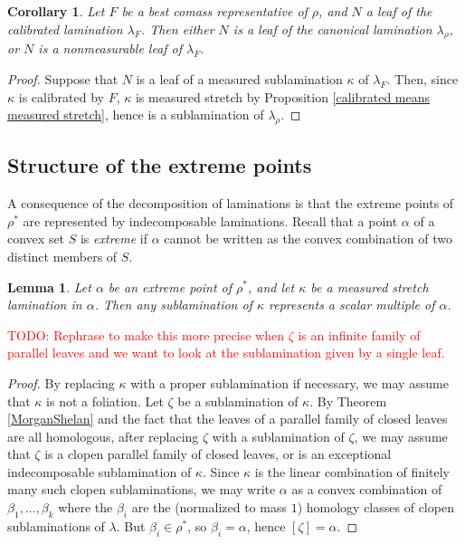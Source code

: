 \documentclass[reqno,11pt]{amsart}
\newcommand{\dfn}[1]{\emph{#1}\index{#1}}
\newtheorem{lemma}[theorem]{Lemma}
\newtheorem{corollary}[theorem]{Corollary}
\theoremstyle{definition}
\numberwithin{equation}{section}
\newcommand\todo[1]{\textcolor{red}{TODO: #1}}
\begin{document}
\begin{corollary}
Let $F$ be a best comass representative of $\rho$, and $N$ a leaf of the calibrated lamination $\lambda_F$.
Then either $N$ is a leaf of the canonical lamination $\lambda_\rho$, or $N$ is a nonmeasurable leaf of $\lambda_F$.
\end{corollary}
\begin{proof}
Suppose that $N$ is a leaf of a measured sublamination $\kappa$ of $\lambda_F$.
Then, since $\kappa$ is calibrated by $F$, $\kappa$ is measured stretch by Proposition \ref{calibrated means measured stretch}, hence is a sublamination of $\lambda_\rho$.
\end{proof}

\subsection{Structure of the extreme points}
A consequence of the decomposition of laminations is that the extreme points of $\rho^*$ are represented by indecomposable laminations.
Recall that a point $\alpha$ of a convex set $S$ is \dfn{extreme} if $\alpha$ cannot be written as the convex combination of two distinct members of $S$.

\begin{lemma}\label{extreme points are closed under sublaminations}
Let $\alpha$ be an extreme point of $\rho^*$, and let $\kappa$ be a measured stretch lamination in $\alpha$.
Then any sublamination of $\kappa$ represents a scalar multiple of $\alpha$.
\end{lemma}
\todo{Rephrase to make this more precise when $\zeta$ is an infinite family of parallel leaves and we want to look at the sublamination given by a single leaf.}
\begin{proof}
By replacing $\kappa$ with a proper sublamination if necessary, we may assume that $\kappa$ is not a foliation.
Let $\zeta$ be a sublamination of $\kappa$.
By Theorem \ref{MorganShelan} and the fact that the leaves of a parallel family of closed leaves are all homologous, after replacing $\zeta$ with a sublamination of $\zeta$, we may assume that $\zeta$ is a clopen parallel family of closed leaves, or is an exceptional indecomposable sublamination of $\kappa$.
Since $\kappa$ is the linear combination of finitely many such clopen sublaminations, we may write $\alpha$ as a convex combination of $\beta_1, \dots, \beta_k$ where the $\beta_i$ are the (normalized to mass $1$) homology classes of clopen sublaminations of $\lambda$.
But $\beta_i \in \rho^*$, so $\beta_i = \alpha$, hence $[\zeta] = \alpha$.
\end{proof}
\end{document}
